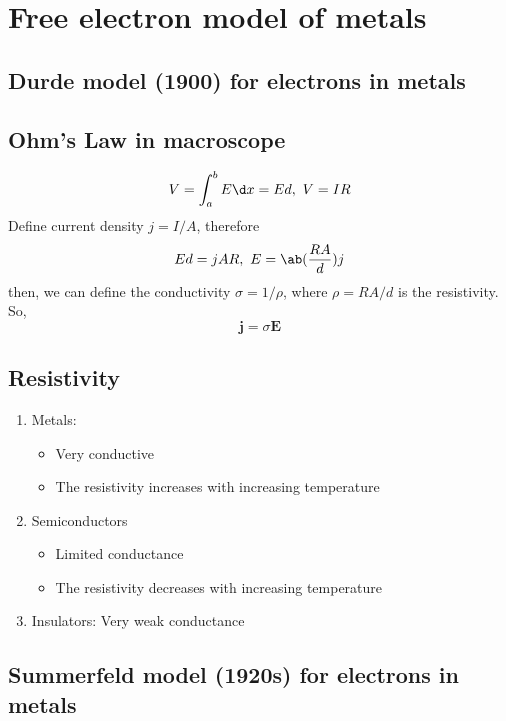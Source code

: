 
\chapter{Free electron model of metals}

\section{Durde model (1900) for electrons in metals}

\section{Ohm's Law in macroscope}

\begin{equation}
  V = \int_a^b E \d x = Ed,~ V = IR
\end{equation}
Define current density $j = I/A$, therefore
\[
  Ed = jAR,~ E = \ab(\frac{RA}d) j
\]
then, we can define the conductivity $\sigma = 1/\rho$,
where $\rho = RA/d$ is the resistivity. So,
\begin{equation}
  \bm j = \sigma \bm E
\end{equation}

\section{Resistivity}

\begin{enumerate}
  \item Metals:
  \begin{itemize}
    \item Very conductive
    \item The resistivity increases with increasing temperature
  \end{itemize}
  \item Semiconductors
  \begin{itemize}
    \item Limited conductance
    \item The resistivity decreases with increasing temperature
  \end{itemize}
  \item Insulators: Very weak conductance
\end{enumerate}

\section{Summerfeld model (1920s) for electrons in metals}

